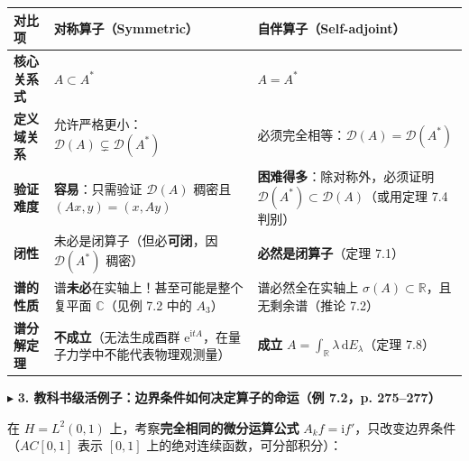 \documentclass[11pt,a4paper]{article}
\newcounter{none}
\newcommand{\SubSubHeading}[1]{%
  \Needspace{6.5\baselineskip}\vspace{5.5pt}\noindent
  \textcolor{AccentMain}{\scriptsize$\blacktriangleright$}\hspace{4pt}%
  {\small\bfseries\color{AccentMain}#1}\par\nopagebreak[4]\vspace{2.5pt}%
}
\begin{document}
{\def\LTcaptype{none} %
{\small\renewcommand{\arraystretch}{1.38}\setlength{\tabcolsep}{5pt}
\begin{longtable}[]{@{}
  >{\raggedright\arraybackslash}p{}
  >{\raggedright\arraybackslash}p{}
  >{\raggedright\arraybackslash}p{}@{}}
\toprule\noalign{}
\rowcolor{AccentSoft}
\begin{minipage}[b]{\linewidth}\raggedright
对比项
\end{minipage} & \begin{minipage}[b]{\linewidth}\raggedright
对称算子（Symmetric）
\end{minipage} & \begin{minipage}[b]{\linewidth}\raggedright
自伴算子（Self-adjoint）
\end{minipage} \\
\midrule\noalign{}
\endhead
\bottomrule\noalign{}
\endlastfoot
\textbf{核心关系式} & \(A \subset A^*\) & \(A = A^*\) \\
\textbf{定义域关系} & 允许严格更小：\(\mathcal{D}(A) \subsetneq \mathcal{D}(A^*)\) & 必须完全相等：\textbf{\(\mathcal{D}(A) = \mathcal{D}(A^*)\)} \\
\textbf{验证难度} & \textbf{容易}：只需验证 \(\mathcal{D}(A)\) 稠密且 \((Ax,y)=(x,Ay)\) & \textbf{困难得多}：除对称外，必须证明 \(\mathcal{D}(A^*) \subset \mathcal{D}(A)\)（或用定理 7.4 判别） \\
\textbf{闭性} & 未必是闭算子（但必\textbf{可闭}，因 \(\mathcal{D}(A^*)\) 稠密） & \textbf{必然是闭算子}（定理 7.1） \\
\textbf{谱的性质} & 谱\textbf{未必}在实轴上！甚至可能是整个复平面 \(\mathbb{C}\)（见例 7.2 中的 \(A_3\)） & 谱必然全在实轴上 \textbf{\(\sigma(A) \subset \mathbb{R}\)}，且无剩余谱（推论 7.2） \\
\textbf{谱分解定理} & \textbf{不成立}（无法生成酉群 \(\mathrm{e}^{\mathrm{i}tA}\)，在量子力学中不能代表物理观测量） & \textbf{成立} \(A = \int_{\mathbb{R}} \lambda\,\mathrm{d}E_\lambda\)（定理 7.8） \\
\end{longtable}
}
}

\SubSubHeading{3. 教科书级活例子：边界条件如何决定算子的命运（例 7.2，p. 275--277）}

在 \(H = L^2(0, 1)\) 上，考察\textbf{完全相同的微分运算公式} \(A_k f = \mathrm{i} f'\)，只改变边界条件（\(AC[0,1]\) 表示 \([0,1]\) 上的绝对连续函数，可分部积分）：
\end{document}
